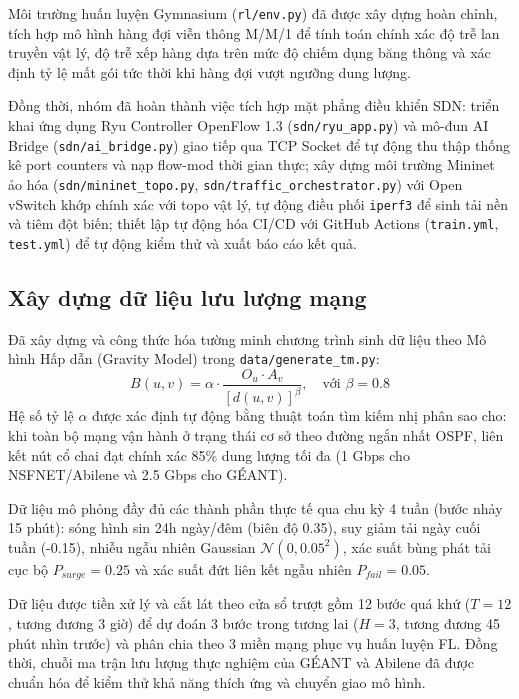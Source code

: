 \documentclass[11pt,a4paper]{article}
\begin{document}
Môi trường huấn luyện Gymnasium (\texttt{rl/env.py}) đã được xây dựng hoàn chỉnh, tích hợp mô hình hàng đợi viễn thông M/M/1 để tính toán chính xác độ trễ lan truyền vật lý, độ trễ xếp hàng dựa trên mức độ chiếm dụng băng thông và xác định tỷ lệ mất gói tức thời khi hàng đợi vượt ngưỡng dung lượng.

Đồng thời, nhóm đã hoàn thành việc tích hợp mặt phẳng điều khiển SDN: triển khai ứng dụng Ryu Controller OpenFlow 1.3 (\texttt{sdn/ryu\_app.py}) và mô-đun AI Bridge (\texttt{sdn/ai\_bridge.py}) giao tiếp qua TCP Socket để tự động thu thập thống kê port counters và nạp flow-mod thời gian thực; xây dựng môi trường Mininet ảo hóa (\texttt{sdn/mininet\_topo.py}, \texttt{sdn/traffic\_orchestrator.py}) với Open vSwitch khớp chính xác với topo vật lý, tự động điều phối \texttt{iperf3} để sinh tải nền và tiêm đột biến; thiết lập tự động hóa CI/CD với GitHub Actions (\texttt{train.yml}, \texttt{test.yml}) để tự động kiểm thử và xuất báo cáo kết quả.

\subsection{Xây dựng dữ liệu lưu lượng mạng}
Đã xây dựng và công thức hóa tường minh chương trình sinh dữ liệu theo Mô hình Hấp dẫn (Gravity Model) trong \texttt{data/generate\_tm.py}:
\begin{equation}
    B(u, v) = \alpha \cdot \frac{O_u \cdot A_v}{[d(u, v)]^\beta}, \quad \text{với } \beta = 0.8
\end{equation}
Hệ số tỷ lệ $\alpha$ được xác định tự động bằng thuật toán tìm kiếm nhị phân sao cho: khi toàn bộ mạng vận hành ở trạng thái cơ sở theo đường ngắn nhất OSPF, liên kết nút cổ chai đạt chính xác 85\% dung lượng tối đa (1 Gbps cho NSFNET/Abilene và 2.5 Gbps cho GÉANT).

Dữ liệu mô phỏng đầy đủ các thành phần thực tế qua chu kỳ 4 tuần (bước nhảy 15 phút): sóng hình sin 24h ngày/đêm (biên độ 0.35), suy giảm tải ngày cuối tuần (-0.15), nhiễu ngẫu nhiên Gaussian $\mathcal{N}(0, 0.05^2)$, xác suất bùng phát tải cục bộ $P_{surge} = 0.25$ và xác suất đứt liên kết ngẫu nhiên $P_{fail} = 0.05$.

Dữ liệu được tiền xử lý và cắt lát theo cửa sổ trượt gồm 12 bước quá khứ ($T=12$, tương đương 3 giờ) để dự đoán 3 bước trong tương lai ($H=3$, tương đương 45 phút nhìn trước) và phân chia theo 3 miền mạng phục vụ huấn luyện FL. Đồng thời, chuỗi ma trận lưu lượng thực nghiệm của GÉANT và Abilene đã được chuẩn hóa để kiểm thử khả năng thích ứng và chuyển giao mô hình.
\end{document}
